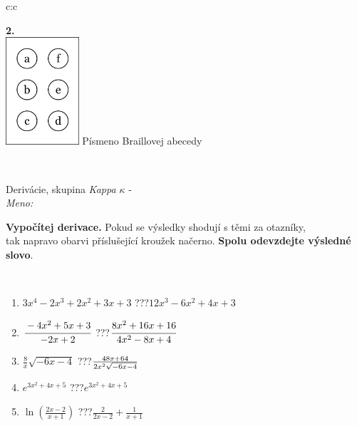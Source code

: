 \documentclass[10pt]{report}
\begin{document}
\begin{tabular}{c:c}
\begin{minipage}[c][104.5mm][t]{0.5\linewidth}
\begin{center}
\begin{minipage}{0.20\linewidth}
\begin{center}
{\Huge\bfseries 2.} \\[2mm]
\includegraphics[height=40mm]{../images/braille.png}
{\small Písmeno Braillovej abecedy}
\end{center}
\end{minipage}
\end{center}
\end{minipage}
\\ \hdashline
\begin{minipage}[c][104.5mm][t]{0.5\linewidth}
\begin{center}
\vspace{7mm}
{\huge Derivácie, skupina \textit{Kappa $\kappa$} -}\\[5mm]
\textit{Meno:}\phantom{xxxxxxxxxxxxxxxxxxxxxxxxxxxxxxxxxxxxxxxxxxxxxxxxxxxxxxxxxxxxxxxxx}\\[5mm]
\begin{minipage}{0.95\linewidth}
\begin{center}
\textbf{Vypočítej derivace.} Pokud se výsledky shodují s těmi za otazníky,\\tak napravo obarvi příslušející kroužek načerno. \textbf{Spolu odevzdejte výsledné slovo}.
\end{center}
\end{minipage}
\\[1mm]
\begin{minipage}{0.79\linewidth}
\begin{center}
\begin{varwidth}{\linewidth}
\begin{enumerate}
\normalsize
\item $3x^4-2x^3+2x^2+3x+3$\quad \dotfill\; ???\;\dotfill \quad $12x^3-6x^2+4x+3$
\item $\cfrac{-4x^2+5x+3}{-2x+2}$\quad \dotfill\; ???\;\dotfill \quad $\cfrac{8x^2+16x+16}{4x^2-8x+4}$
\item $\frac{8}{x}\sqrt{-6x-4}$\quad \dotfill\; ???\;\dotfill \quad $\frac{48x+64}{2x^2 \sqrt{\smash[b]{-6x-4}}}$
\item $e^{3x^2+4x+5}$\quad \dotfill\; ???\;\dotfill \quad $e^{3x^2+4x+5}$
\item $\ln{\left(\frac{2x-2}{x+1}\right)}$\quad \dotfill\; ???\;\dotfill \quad $\frac{2}{2x-2}+\frac{1}{x+1}$

\end{enumerate}
\end{varwidth}
\end{center}
\end{minipage}
\end{center}
\end{minipage}
\end{tabular}
\end{document}
